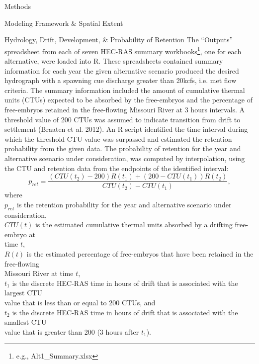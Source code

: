 \documentclass[12pt]{article}
\begin{document}
\begin{section}{Methods}
\begin{subsection}{Modeling Framework \& Spatial Extent}
\begin{subsubsection}{Hydrology, Drift, Development, \& Probability of Retention}
The ``Outputs'' spreadsheet from each of seven HEC-RAS summary workbooks\footnote{e.g., Alt1\_Summary.xlsx}, one for each alternative, were loaded into R.  These spreadsheets contained summary information for each year the given alternative scenario produced the desired hydrograph with a spawning cue discharge greater than 20kcfs, i.e. met flow criteria.  The summary information included the amount of cumulative thermal units (CTUs) expected to be absorbed by the free-embryos and the percentage of free-embryos retained in the free-flowing Missouri River at 3 hours intervals.  A threshold value of 200 CTUs was assumed to indicate transition from drift to settlement (Braaten et al. 2012).  An R script identified the time interval during which the threshold CTU value was surpassed and estimated the retention probability from the given data.  The probability of retention for the year and alternative scenario under consideration, was computed by interpolation, using the CTU and retention data from the endpoints of the identified interval:
\begin{equation}
p_{ret}=\frac{(CTU(t_2)-200)R(t_1)+(200-CTU(t_1))R(t_2)}{CTU(t_2)-CTU(t_1)},
\end{equation}  
where\\
\hspace*{0.5cm}$p_{ret}$ is the retention probability for the year and alternative scenario under consideration,\\
\hspace*{0.5cm}$CTU(t)$ is the estimated cumulative thermal units absorbed by a drifting free-embryo at\\
\hspace*{1.5cm}time $t$,\\
\hspace*{0.5cm}$R(t)$ is the estimated percentage of free-embryos that have been retained in the free-flowing\\
\hspace*{1.5cm}Missouri River at time $t$,\\
\hspace*{0.5cm}$t_1$ is the discrete HEC-RAS time in hours of drift that is associated with the largest CTU\\ 
\hspace*{1.5cm}value that is less than or equal to 200 CTUs, and\\
\hspace*{0.5cm}$t_2$ is the discrete HEC-RAS time in hours of drift that is associated with the smallest CTU\\
\hspace*{1.5cm}value that is greater than 200 (3 hours after $t_1$).\\
\end{subsubsection}


\end{subsection}
\end{section}
\end{document}
